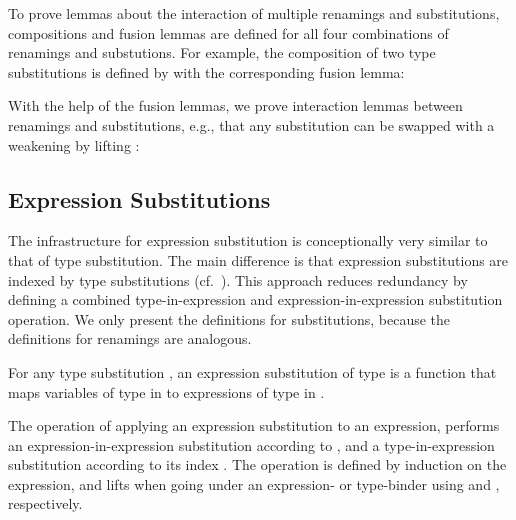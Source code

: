 \documentclass[acmsmall,anonymous,review,screen]{acmart}
\begin{document}
To prove lemmas about the interaction of multiple renamings and substitutions,
compositions and fusion lemmas are defined for all four combinations
of renamings and substutions.
For example, the composition of two type substitutions is defined by
\SubstExamplesTCompSS
with the corresponding fusion lemma:
\SubstExamplesFusionTSubTSub

With the help of the fusion lemmas, we prove interaction lemmas
between renamings and substitutions, e.g., that any substitution
 can be swapped with a weakening  by lifting :
\TFSwapTsubTwk



\subsection{Expression Substitutions}
\label{sec:substitutions:expr}

The infrastructure for expression substitution is conceptionally very similar to
that of type substitution.
The main difference is that expression substitutions are indexed by
type substitutions (cf.~\cite{DBLP:conf/mpc/ChapmanKNW19}).
This approach reduces redundancy by defining a combined type-in-expression and
expression-in-expression substitution operation.
We only present the definitions for substitutions, because
the definitions for renamings are analogous.

For any type substitution , an expression substitution of
type  is a function that maps variables of type  in
 to expressions of type  in .
\SubDefESub

The operation {\AEsub} of applying an expression substitution  to an expression,
performs an expression-in-expression substitution according to ,
and a type-in-expression substitution according to its index .
The operation is defined by induction on the expression, and lifts  when
going under an expression- or type-binder using {\AEliftS} and
{\AEliftSL}, respectively.
\SubDefEsub

\end{document}
